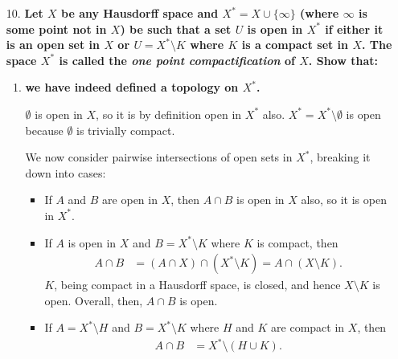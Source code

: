 \documentclass[a4paper,12pt]{article}
\begin{document}
\begin{enumerate}
    \item[10.]
        \boldmath\textbf{Let $X$ be any Hausdorff space and $X^* = X \cup \{\infty\}$ (where $\infty$ is some point not in $X$) be such that a set $U$ is open in $X^*$ if either it is an open set in $X$ or $U = X^* \setminus K$ where $K$ is a compact set in $X$. The space $X^*$ is called the \emph{one point compactification} of $X$. Show that:
        }\unboldmath \par
        \begin{enumerate}
            \item
                \boldmath\textbf{we have indeed defined a topology on $X^*$.
                }\unboldmath \par
                $\emptyset$ is open in $X$, so it is by definition open in $X^*$ also. $X^* = X^* \setminus \emptyset$ is open because $\emptyset$ is trivially compact. \par%
                We now consider pairwise intersections of open sets in $X^*$, breaking it down into cases: %
                \begin{itemize}
                    \item
                        If $A$ and $B$ are open in $X$, then $A \cap B$ is open in $X$ also, so it is open in $X^*$.
                    \item
                        If $A$ is open in $X$ and $B = X^* \setminus K$ where $K$ is compact, then
                        \begin{align*}
                            A \cap B &= (A \cap X) \cap (X^* \setminus K) = A \cap (X \setminus K).
                        \end{align*}
                        $K$, being compact in a Hausdorff space, is closed, and hence $X \setminus K$ is open. Overall, then, $A \cap B$ is open.
                    \item
                        If $A = X^* \setminus H$ and $B = X^* \setminus K$ where $H$ and $K$ are compact in $X$, then
                        \begin{align*}
                            A \cap B &= X^* \setminus (H \cup K).
                        \end{align*}

\end{itemize}
\end{enumerate}
\end{enumerate}
\end{document}

